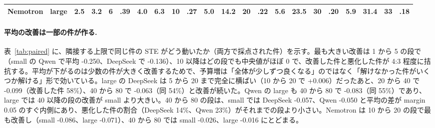 \documentclass{article}
\providecommand{\unverified}[1]{#1}
\begin{document}
\begin{table}[t]
{\begin{tabular}{llrrrrrrrrrrrrrrrrrrrr}
Nemotron & large & \unverified{2.5} & \unverified{3.2} & \unverified{6} & \unverified{.39} & \unverified{4.0} & \unverified{6.3} & \unverified{10} & \unverified{.27} & \unverified{5.0} & \unverified{14.2} & \unverified{20} & \unverified{.22} & \unverified{5.6} & \unverified{23.5} & \unverified{30} & \unverified{.20} & \unverified{5.9} & \unverified{31.4} & \unverified{33} & \unverified{.18} \\
\hline
\end{tabular}}
\end{table}

\paragraph{平均の改善は一部の件が作る.}
表~\ref{tab:paired} に、隣接する上限で同じ件の STE がどう動いたか（両方で採点された件）を示す。最も大きい改善は 1 から 5 の段で（small の Qwen で平均 \unverified{-0.250}、DeepSeek で \unverified{-0.136}）、10 以降はどの段でも中央値がほぼ 0 で、改善した件と悪化した件が 4:3 程度に拮抗する。平均が下がるのは少数の件が大きく改善するためで、予算増は「全体が少しずつ良くなる」のではなく「解けなかった件がいくつか解ける」形で効いている。large の DeepSeek は 5 から 20 まで完全に横ばい（10 から 20 で \unverified{+0.006}）だったあと、20 から 40 で \unverified{-0.099}（改善した件 \unverified{58}\%）、40 から 80 で \unverified{-0.063}（同 \unverified{54}\%）と改善が続いた。Qwen の large も 40 から 80 で \unverified{-0.083}（同 \unverified{55}\%）であり、large では 40 以降の段の改善が small より大きい。40 から 80 の段は、small では DeepSeek \unverified{-0.057}、Qwen \unverified{-0.050} と平均の差が margin 0.05 のすぐ内側にあり、悪化した件の割合（DeepSeek \unverified{14}\%、Qwen \unverified{23}\%）がそれまでの段より小さい。Nemotron は 10 から 20 の段で最も改善し（small \unverified{-0.086}、large \unverified{-0.071}）、40 から 80 では small \unverified{-0.026}、large \unverified{-0.016} にとどまる。
\end{document}
